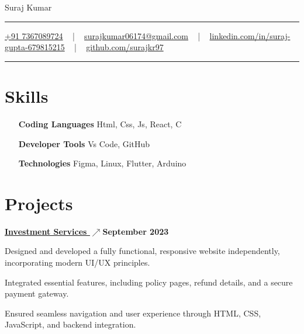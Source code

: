 \documentclass[letterpaper,10pt]{article}
\newcommand{\documentTitle}[2]{
  \begin{center}
    {\Huge\color{accentTitle} #1}
    \vspace{10pt}
    {\color{accentLine} \hrule}
    \vspace{2pt}
    \footnotesize{#2}
    \vspace{2pt}
    {\color{accentLine} \hrule}
  \end{center}
}
\newcommand{\tinysection}[1]{
  \phantomsection
  \addcontentsline{toc}{section}{#1}
  {\large{\bfseries\color{accentText}#1} {\color{accentLine} |}}
}
\newcommand{\heading}[2]{
  \hspace{10pt}#1\hfill#2\\
}
\newcommand{\headingBf}[2]{
  \heading{\textbf{#1}}{\textbf{#2}}
}
\newenvironment{resume_list}{
  \vspace{-7pt}
  \begin{itemize}[itemsep=-2px, parsep=1pt, leftmargin=30pt]
}{
  \end{itemize}
}
\begin{document}
\documentTitle{Suraj Kumar}{
    \href{tel:+917367089724}{
      \raisebox{-0.05\height}{\faPhone} +91 7367089724} ~ | ~
    \href{mailto:surajkumar06174@gmail.com}{
      \raisebox{-0.15\height}{\faEnvelope} surajkumar06174@gmail.com} ~ | ~
    \href{https://linkedin.com/in/suraj-gupta-679815215}{
      \raisebox{-0.15\height}{\faLinkedin} linkedin.com/in/suraj-gupta-679815215} ~ | ~
    \href{https://github.com/surajkr97}{
      \raisebox{-0.15\height}{\faGithub} github.com/surajkr97}
}




  \section{Skills}

    \begin{itemize}[itemsep=-2px, parsep=1pt, leftmargin=100pt]
      \item[\textbf{Coding Languages}] Html, Css, Js, React, C
      \item[\textbf{Developer Tools}] Vs Code, GitHub
      \item[\textbf{Technologies}] Figma, Linux, Flutter, Arduino
    \end{itemize}



  \section{Projects}
    \headingBf {\underline{\href{https://shivamsecurities.com/}{Investment Services \(\nearrow\)}}}{September 2023}
    \begin{resume_list}
    \item Designed and developed a fully functional, responsive website independently, incorporating modern UI/UX principles.
    \item Integrated essential features, including policy pages, refund details, and a secure payment gateway.
    \item Ensured seamless navigation and user experience through HTML, CSS, JavaScript, and backend integration.
    \end{resume_list} 
    
\end{document}
